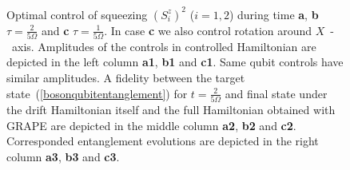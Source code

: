 \documentclass[
aps,%
12pt,%
final,%
notitlepage,%
oneside,%
onecolumn,%
nobibnotes,%
nofootinbib,%
superscriptaddress,%
noshowpacs,%
centertags]%
{revtex4}
\begin{document}
\newpage

\begin{figure}[t!]
\setcaptionmargin{5mm}
\onelinecaptionsfalse
{}
\caption{
    Optimal control of squeezing $(S^z_i)^2$ ($i=1,2$) during time {\bf a}, {\bf b} $\tau=\frac{2}{5\Omega}$ and {\bf c} $\tau=\frac{1}{5\Omega}$. In case {\bf c} we also control rotation around $X$~-~axis. Amplitudes of the controls in controlled Hamiltonian are depicted in the left column {\bf a1}, {\bf b1} and {\bf c1}. Same qubit controls have similar amplitudes. A fidelity between the target state~(\ref{bosonqubitentanglement}) for $t=\frac{2}{5\Omega}$ and final state under the drift Hamiltonian itself and the full Hamiltonian obtained with GRAPE are depicted in the middle column {\bf a2}, {\bf b2} and {\bf c2}. Corresponded entanglement evolutions are depicted in the right column {\bf a3}, {\bf b3} and {\bf c3}.
}
\label{fig4:squeezing}
\end{figure}


% 

\end{document}
